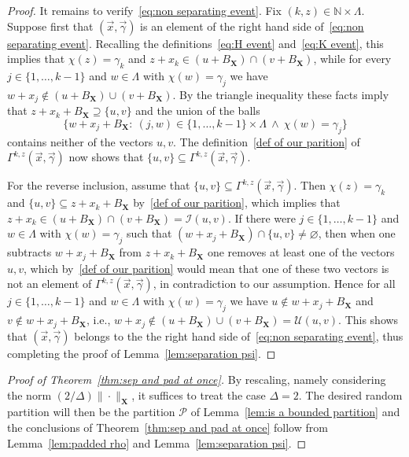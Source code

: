 \documentclass[11pt,reqno]{amsart}
\newcommand{\X}{\mathbf X}
\theoremstyle{remark}
\renewcommand{\supset}{\supseteq}
\renewcommand{\subset}{\subseteq}
\newcommand{\N}{\mathbb N}
\renewcommand{\emptyset}{\varnothing}
\renewcommand{\1}{\mathbf 1}
\newcommand{\Part}{\mathscr{P}}
\begin{document}
\begin{proof}
It remains to verify~\eqref{eq:non separating event}. Fix $(k,z)\in \N\times \Lambda$. Suppose first that $(\vec{x},\vec{\gamma})$ is an element of the right hand side of~\eqref{eq:non separating event}. Recalling the definitions~\eqref{eq:H event} and~\eqref{eq:K event}, this implies that $\chi(z)=\gamma_k$ and $z+x_k\in (u+B_{\X})\cap (v+B_{\X})$, while for every $j\in \{1,\ldots,k-1\}$ and $w\in \Lambda$ with $\chi(w)=\gamma_j$ we have $w+x_j\notin (u+B_{\X})\cup (v+B_{\X})$. By the triangle inequality these facts imply that $z+x_k+B_{\X}\supset \{u,v\}$ and the union of the balls $$\big\{w+x_j+B_{\X}:\ (j,w)\in \{1,\ldots,k-1\}\times \Lambda\ \wedge\ \chi(w)=\gamma_j\big\}$$ contains neither of the vectors $u,v$. The definition~\eqref{def of our parition} of $\Gamma^{k,z}(\vec{x},\vec{\gamma})$  now shows that $\{u,v\}\subset \Gamma^{k,z}(\vec{x},\vec{\gamma})$.

For the reverse inclusion, assume that $\{u,v\}\subset \Gamma^{k,z}(\vec{x},\vec{\gamma})$. Then  $\chi(z)=\gamma_k$ and $\{u,v\}\subset z+x_k+B_{\X}$ by~\eqref{def of our parition}, which implies that $z+x_k\in (u+B_{\X})\cap (v+B_{\X})= \mathscr{I}(u,v)$. If there were $j\in \{1,\ldots,k-1\}$ and $w\in \Lambda$ with $\chi(w)=\gamma_j$ such that $(w+x_j+B_{\X})\cap \{u,v\}\neq \emptyset $, then when one subtracts $w+x_j+B_{\X}$ from  $z+x_k+B_{\X}$ one removes at least one of the vectors $u,v$, which by~\eqref{def of our parition} would mean that one of these two vectors is not an element of $\Gamma^{k,z}(\vec{x},\vec{\gamma})$, in contradiction to our assumption. Hence for all $j\in \{1,\ldots,k-1\}$ and $w\in \Lambda$ with $\chi(w)=\gamma_j$ we have $u\notin w+x_j+B_{\X}$ and $v\notin w+x_j+B_{\X}$, i.e., $w+x_j\notin (u+B_{\X})\cup (v+B_{\X})=\mathscr{U}(u,v)$. This shows that $(\vec{x},\vec{\gamma})$ belongs to the the right hand side of~\eqref{eq:non separating event}, thus completing the proof of Lemma~\ref{lem:separation psi}.
\end{proof}


\begin{proof}[Proof of Theorem~\ref{thm:sep and pad at once}] By rescaling, namely considering the norm $(2/\Delta)\|\cdot\|_{\X}$, it suffices to treat the case $\Delta=2$. The desired random partition will then be the partition $\Part$ of Lemma~\ref{lem:is a bounded partition} and the conclusions of Theorem~\ref{thm:sep and pad at once}   follow from Lemma~\ref{lem:padded rho} and Lemma~\ref{lem:separation psi}.
\end{proof}
\end{document}
